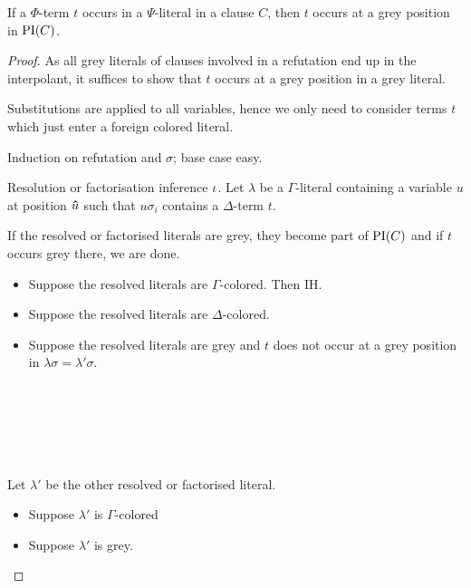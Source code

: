 \documentclass[,%
	draft=false,%
	numbers=noendperiod
	12pt,
	a4paper,
	oneside,%
	openany,
]{memoir}
\begin{document}
\begin{clemma}
	If a $\Phi$-term $t$ occurs in a $\Psi$-literal in a clause $C$, then $t$ occurs at a grey position in $\operatorname{PI}(C)$.
\end{clemma}
\begin{proof}
	As all grey literals of clauses involved in a refutation end up in the interpolant, it suffices to show that $t$ occurs at a grey position in a grey literal. 

	Substitutions are applied to all variables, hence we only need to consider terms $t$ which just enter a foreign colored literal.



	Induction on refutation and $\sigma$; base case easy.

	Resolution or factorisation inference $\iota$. 
	Let $\lambda$ be a $\Gamma$-literal containing a variable $u$ at position $\bm\hat u$ such that $u\sigma_i$ contains a $\Delta$-term $t$.

	If the resolved or factorised literals are grey, they become part of $\operatorname{PI}(C)$ and if $t$ occurs grey there, we are done.

	\begin{itemize}
		\item Suppose the resolved literals are $\Gamma$-colored. Then IH.
		\item Suppose the resolved literals are $\Delta$-colored.
			\mytodo{}
		\item Suppose the resolved literals are grey and $t$ does not occur at a grey position in $\lambda\sigma = \lambda'\sigma$.
			\mytodo{}

	\end{itemize}


	~

	~

	~



	Let $\lambda'$ be the other resolved or factorised literal.

	\begin{itemize}
		\item Suppose $\lambda'$ is $\Gamma$-colored
		\item Suppose $\lambda'$ is grey.
	\end{itemize}


	



	
\end{proof}
\end{document}
